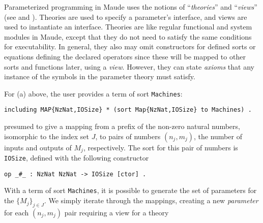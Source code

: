 \documentclass[copyright,creativecommons]{eptcs}
\begin{document}
Parameterized programming in Maude uses the notions of ``\emph{theories}'' and
``\emph{views}'' (see \cite[\S 8.3.1]{clavel_2007_01} and \cite[\S 8.3.2]{clavel_2007_01}). Theories are
used to specify a parameter's interface, and views are used to instantiate an
interface. Theories are like regular functional and system modules in Maude,
except that they do not need to satisfy the same conditions for executability.
In general, they also may omit constructors for defined sorts or equations
defining the declared operators since these will be mapped to other sorts and
functions later, using a \emph{view}. However, they can state \emph{axioms}
that any instance of the symbols in the parameter theory must satisfy.

For (a) above, the user provides a term of sort {\tt Machines}:

\begin{center}
\begin{small}
\begin{boxedminipage}{0.85\textwidth}
\begin{verbatim}
including MAP{NzNat,IOSize} * (sort Map{NzNat,IOSize} to Machines) .
\end{verbatim}
\end{boxedminipage}
\end{small}
\end{center}

\noindent
presumed to give a mapping from a prefix of the non-zero natural numbers,
isomorphic to the index set $J$, to pairs of numbers $(n_j,m_j)$, the number
of inputs and outputs of $M_j$, respectively. The sort for this pair of numbers
is {\tt IOSize}, defined with the following constructor

\begin{center}
\begin{small}
\begin{boxedminipage}{0.50\textwidth}
\begin{verbatim}
op _#_ : NzNat NzNat -> IOSize [ctor] .
\end{verbatim}
\end{boxedminipage}
\end{small}
\end{center}

With a term of sort {\tt Machines}, it is possible to generate the set of
parameters for the $\{M_j\}_{j\in J}$.  We simply iterate through the mappings,
creating a new \emph{parameter} for each $(n_j,m_j)$ pair requiring a view for
a theory 
\end{document}

